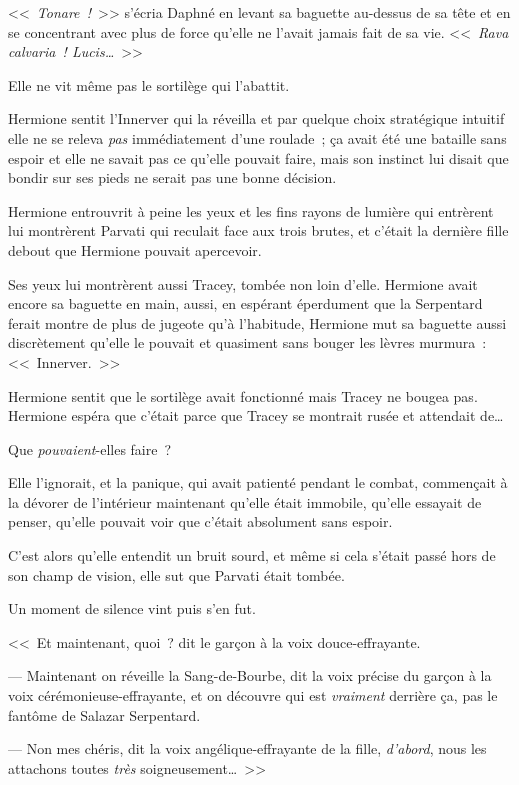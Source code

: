 <<~\emph{Tonare~!}~>> s'écria Daphné en levant sa baguette au-dessus de sa tête et en se concentrant avec plus de force qu'elle ne l'avait jamais fait de sa vie. <<~\emph{Rava calvaria~! Lucis…}~>>

Elle ne vit même pas le sortilège qui l'abattit.

\later

Hermione sentit l'Innerver qui la réveilla et par quelque choix stratégique intuitif elle ne se releva \emph{pas} immédiatement d'une roulade~; ça avait été une bataille sans espoir et elle ne savait pas ce qu'elle pouvait faire, mais son instinct lui disait que bondir sur ses pieds ne serait pas une bonne décision.

Hermione entrouvrit à peine les yeux et les fins rayons de lumière qui entrèrent lui montrèrent Parvati qui reculait face aux trois brutes, et c'était la dernière fille debout que Hermione pouvait apercevoir.

Ses yeux lui montrèrent aussi Tracey, tombée non loin d'elle. Hermione avait encore sa baguette en main, aussi, en espérant éperdument que la Serpentard ferait montre de plus de jugeote qu'à l'habitude, Hermione mut sa baguette aussi discrètement qu'elle le pouvait et quasiment sans bouger les lèvres murmura~: <<~Innerver.~>>

Hermione sentit que le sortilège avait fonctionné mais Tracey ne bougea pas. Hermione espéra que c'était parce que Tracey se montrait rusée et attendait de…

Que \emph{pouvaient}-elles faire~?

Elle l'ignorait, et la panique, qui avait patienté pendant le combat, commençait à la dévorer de l'intérieur maintenant qu'elle était immobile, qu'elle essayait de penser, qu'elle pouvait voir que c'était absolument sans espoir.

C'est alors qu'elle entendit un bruit sourd, et même si cela s'était passé hors de son champ de vision, elle sut que Parvati était tombée.

Un moment de silence vint puis s'en fut.

<<~Et maintenant, quoi~? dit le garçon à la voix douce-effrayante.

--- Maintenant on réveille la Sang-de-Bourbe, dit la voix précise du garçon à la voix cérémonieuse-effrayante, et on découvre qui est \emph{vraiment} derrière ça, pas le fantôme de Salazar Serpentard.

--- Non mes chéris, dit la voix angélique-effrayante de la fille, \emph{d'abord}, nous les attachons toutes \emph{très} soigneusement…~>>

